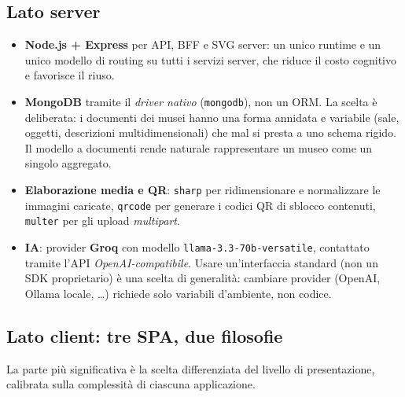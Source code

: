 \documentclass[11pt,a4paper]{article}
\newcommand{\code}[1]{\texttt{#1}}
\begin{document}
\subsection{Lato server}
\begin{itemize}[leftmargin=1.3em]
  \item \textbf{Node.js + Express} per API, BFF e SVG server: un unico runtime e
    un unico modello di routing su tutti i servizi server, che riduce il costo
    cognitivo e favorisce il riuso.
  \item \textbf{MongoDB} tramite il \emph{driver nativo} (\code{mongodb}), non un
    ORM. La scelta è deliberata: i documenti dei musei hanno una forma
    annidata e variabile (sale, oggetti, descrizioni multidimensionali) che mal
    si presta a uno schema rigido. Il modello a documenti rende naturale
    rappresentare un museo come un singolo aggregato.
  \item \textbf{Elaborazione media e QR}: \code{sharp} per ridimensionare e
    normalizzare le immagini caricate, \code{qrcode} per generare i codici QR di
    sblocco contenuti, \code{multer} per gli upload \emph{multipart}.
  \item \textbf{IA}: provider \textbf{Groq} con modello
    \code{llama-3.3-70b-versatile}, contattato tramite l'API
    \emph{OpenAI-compatibile}. Usare un'interfaccia standard (non un SDK
    proprietario) è una scelta di generalità: cambiare provider (OpenAI, Ollama
    locale, \dots) richiede solo variabili d'ambiente, non codice.
\end{itemize}

\subsection{Lato client: tre SPA, due filosofie}
La parte più significativa è la scelta differenziata del livello di
presentazione, calibrata sulla complessità di ciascuna applicazione.
\end{document}
